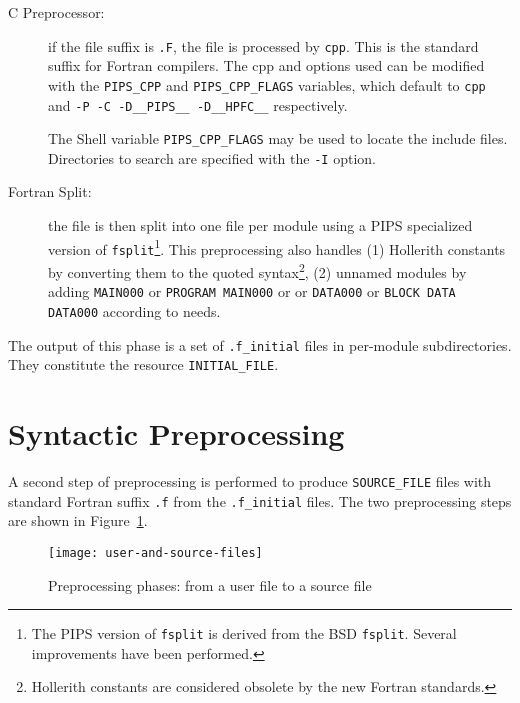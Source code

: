 \documentclass[a4paper]{report}
\begin{document}
\begin{description}
\item[C Preprocessor:] if the file suffix is \verb|.F|, the file is
  processed by \verb|cpp|. This is the standard suffix for Fortran compilers.
  The cpp and options used can be modified with the \verb|PIPS_CPP| and
  \verb|PIPS_CPP_FLAGS| variables, which default to \verb|cpp| and
  \verb|-P -C -D__PIPS__ -D__HPFC__| respectively.

  The Shell variable \verb|PIPS_CPP_FLAGS| may be used to locate the include
  files. Directories to search are specified with the \verb/-I/ option.

\item[Fortran Split:] the file is then split into one file per module
  using a PIPS specialized version of \texttt{fsplit}\footnote{The PIPS
    version of \texttt{fsplit} is derived from the BSD \texttt{fsplit}.
    Several improvements have been performed.}. This preprocessing also
  handles (1) Hollerith constants by converting them to the quoted
  syntax\footnote{Hollerith constants are considered obsolete by the new
    Fortran standards.}, (2) unnamed modules by adding \texttt{MAIN000} or
  \texttt{PROGRAM MAIN000} or or \texttt{DATA000} or \texttt{BLOCK DATA
    DATA000} according to needs.

\end{description}

The output of this phase is a set of \verb|.f_initial| files in per-module
subdirectories. They constitute the resource \verb|INITIAL_FILE|.


\section{Syntactic Preprocessing}
\label{subsection-syntactic-preprocessing}

A second step of preprocessing is performed to produce \verb/SOURCE_FILE/
files with standard Fortran suffix \texttt{.f} from the \verb|.f_initial|
files. The two preprocessing steps are shown in
Figure~\ref{figure-user-and-source-files}.

\begin{figure}
\begin{center}
\mbox{\texttt{[image: user-and-source-files]}}
\end{center}
\caption{Preprocessing phases: from a user file to a source file}
\label{figure-user-and-source-files}
\end{figure}
\end{document}
